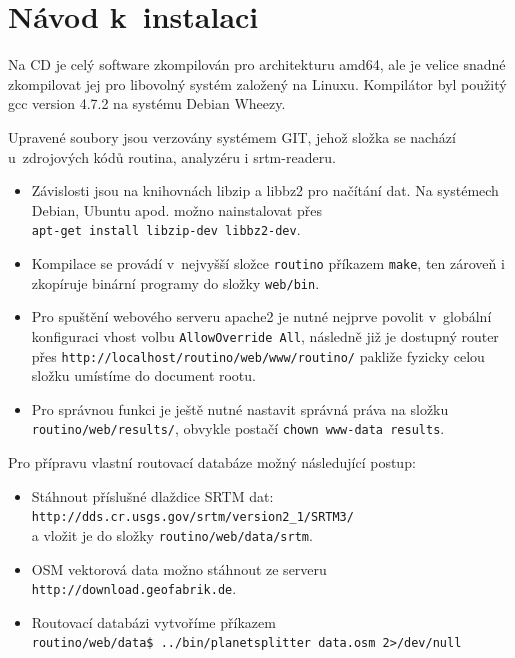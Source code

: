 \documentclass[thesis=B,czech]{FITthesis}[2012/06/26]
\begin{document}
\chapter{Návod k~instalaci}

Na CD je celý software zkompilován pro architekturu amd64, ale je velice snadné zkompilovat jej pro libovolný systém založený na Linuxu. Kompilátor byl použitý gcc version 4.7.2 na systému Debian Wheezy. 

Upravené soubory jsou verzovány systémem GIT, jehož složka se nachází u~zdrojových kódů routina, analyzéru i srtm-readeru.

\begin{itemize}
\item{Závislosti jsou na knihovnách libzip a libbz2 pro načítání dat. Na systémech Debian, Ubuntu apod. možno nainstalovat přes \\ \verb|apt-get install libzip-dev libbz2-dev|.
}

\item{Kompilace se provádí v~nejvyšší složce \verb|routino| příkazem \verb|make|, ten zároveň i zkopíruje binární programy do složky \verb|web/bin|. 
}

\item{Pro spuštění webového serveru apache2 je nutné nejprve povolit v~globální konfiguraci vhost volbu \verb|AllowOverride All|, následně již je dostupný router přes \verb|http://localhost/routino/web/www/routino/| pakliže fyzicky celou složku umístíme do document rootu.
}

\item{Pro správnou funkci je ještě nutné nastavit správná práva na složku \verb|routino/web/results/|, obvykle postačí \verb|chown www-data results|.}

\end{itemize}




Pro přípravu vlastní routovací databáze možný následující postup:

\begin{itemize}

\item{Stáhnout příslušné dlaždice SRTM dat: \\ \verb|http://dds.cr.usgs.gov/srtm/version2_1/SRTM3/| \\
a vložit je do složky \verb|routino/web/data/srtm|.}

\item{OSM vektorová data možno stáhnout ze serveru \\ \verb|http://download.geofabrik.de|.}

\item{Routovací databázi vytvoříme příkazem \\ 
\verb|routino/web/data$ ../bin/planetsplitter data.osm 2>/dev/null|}

\end{itemize}
\end{document}
